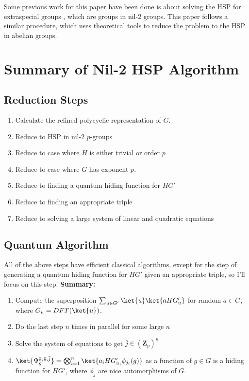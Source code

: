 \documentclass{article}
\begin{document}
Some previous work for this paper have been done is about solving the HSP for extraspecial groups \cite{Ivanyos}, which are groups in nil-2 groups. This paper follows a similar procedure, which uses theoretical tools to reduce the problem to the HSP in abelian groups.

\section{Summary of Nil-2 HSP Algorithm}



\subsection{Reduction Steps}

\begin{enumerate}
\item Calculate the refined polycyclic representation of $G$.
\item Reduce to HSP in nil-2 $p$-groups
\item Reduce to case where $H$ is either trivial or order $p$
\item Reduce to case where $G$ has exponent $p$.
\item Reduce to finding a quantum hiding function for  $HG'$
\item Reduce to finding an appropriate triple
\item Reduce to solving a large system of linear and quadratic equations
\end{enumerate}

\subsection{Quantum Algorithm}

All of the above steps have efficient classical algorithms, except for the step of generating a quantum hiding function for $HG'$ given an appropriate triple, so  I'll focus on this step.
\textbf{Summary:}
\begin{enumerate}
\item Compute the superposition $\sum_{u \in G'} \ket{u} \ket{aHG'_u}$ for random $a \in G$, where $G_u = DFT(\ket{u})$.
\item Do the last step $n$ times in parallel for some large $n$
\item Solve the system of equations to get $\bar j \in (\mathbf{Z}_p)^n$
\item $\ket{\Psi_g^{\bar a, \bar u, \bar j}} = \bigotimes_{i=1}^n \ket {a_i H G'_{u_i} \phi_{j_i}(g)}$ as a function of $g \in G$ is a hiding function for $H G'$, where $\phi_j$ are nice automorphisms of $G$.
\end{enumerate}
\end{document}
